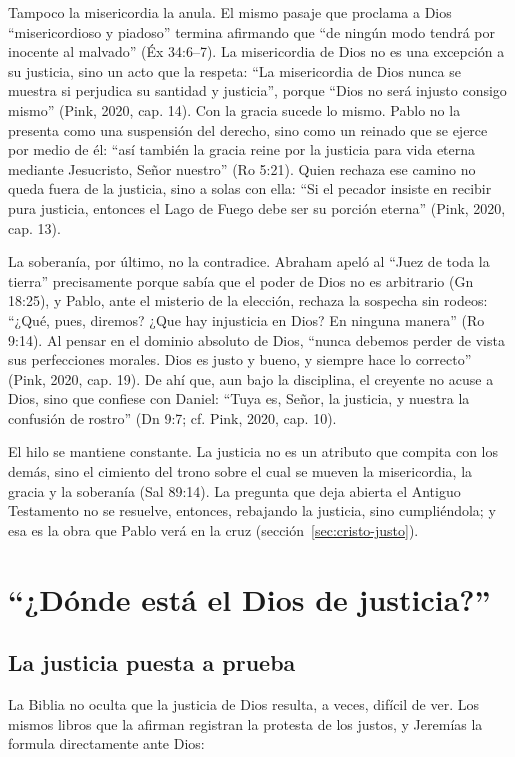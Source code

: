 Tampoco la misericordia la anula. El mismo pasaje que proclama a Dios ``misericordioso y piadoso'' termina afirmando que ``de ningún modo tendrá por inocente al malvado'' (Éx 34:6--7). La misericordia de Dios no es una excepción a su justicia, sino un acto que la respeta: ``La misericordia de Dios nunca se muestra si perjudica su santidad y justicia'', porque ``Dios no será injusto consigo mismo'' (Pink, 2020, cap. 14). Con la gracia sucede lo mismo. Pablo no la presenta como una suspensión del derecho, sino como un reinado que se ejerce por medio de él: ``así también la gracia reine por la justicia para vida eterna mediante Jesucristo, Señor nuestro'' (Ro 5:21). Quien rechaza ese camino no queda fuera de la justicia, sino a solas con ella: ``Si el pecador insiste en recibir pura justicia, entonces el Lago de Fuego debe ser su porción eterna'' (Pink, 2020, cap. 13).

La soberanía, por último, no la contradice. Abraham apeló al ``Juez de toda la tierra'' precisamente porque sabía que el poder de Dios no es arbitrario (Gn 18:25), y Pablo, ante el misterio de la elección, rechaza la sospecha sin rodeos: ``¿Qué, pues, diremos? ¿Que hay injusticia en Dios? En ninguna manera'' (Ro 9:14). Al pensar en el dominio absoluto de Dios, ``nunca debemos perder de vista sus perfecciones morales. Dios es justo y bueno, y siempre hace lo correcto'' (Pink, 2020, cap. 19). De ahí que, aun bajo la disciplina, el creyente no acuse a Dios, sino que confiese con Daniel: ``Tuya es, Señor, la justicia, y nuestra la confusión de rostro'' (Dn 9:7; cf. Pink, 2020, cap. 10).

El hilo se mantiene constante. La justicia no es un atributo que compita con los demás, sino el cimiento del trono sobre el cual se mueven la misericordia, la gracia y la soberanía (Sal 89:14). La pregunta que deja abierta el Antiguo Testamento no se resuelve, entonces, rebajando la justicia, sino cumpliéndola; y esa es la obra que Pablo verá en la cruz (sección~\ref{sec:cristo-justo}).

\section{“¿Dónde está el Dios de justicia?”}

\subsection{La justicia puesta a prueba}
La Biblia no oculta que la justicia de Dios resulta, a veces, difícil de ver. Los mismos libros que la afirman registran la protesta de los justos, y Jeremías la formula directamente ante Dios:


